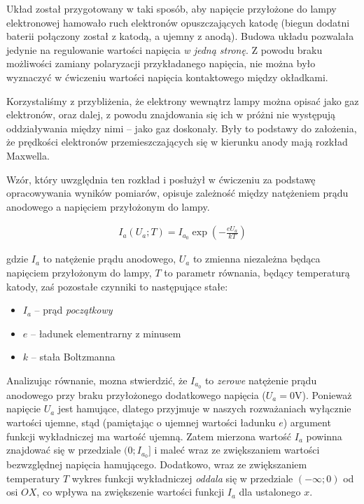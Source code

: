 \documentclass[a4paper]{article}
\newlength{\du}
\begin{document}
Układ został przygotowany w taki sposób, aby napięcie przyłożone do lampy elektronowej hamowało
ruch elektronów opuszczających katodę (biegun dodatni baterii połączony został z katodą, a ujemny z anodą).
Budowa układu pozwalała jedynie na regulowanie wartości napięcia \textit{w jedną stronę}.
Z powodu braku możliwości zamiany polaryzacji przykładanego napięcia, nie można było wyznaczyć 
w ćwiczeniu wartości napięcia kontaktowego między okładkami.

Korzystaliśmy z przybliżenia, że elektrony wewnątrz lampy można opisać jako gaz elektronów, oraz dalej, 
z powodu znajdowania się ich w próżni nie występują oddziaływania między nimi -- jako gaz doskonały.
Były to podstawy do założenia, że prędkości elektronów przemieszczających się w kierunku anody 
mają rozkład Maxwella.

Wzór, który uwzględnia ten rozkład i posłużył w ćwiczeniu za podstawę opracowywania wyników pomiarów,
opisuje zależność między natężeniem prądu anodowego a napięciem przyłożonym do lampy.

\begin{align}
	I_a(U_a; T) = I_{a_0} \exp{\left(-\frac{e U_a}{k T}\right)}
\label{eq1}
\end{align}

gdzie $I_a$ to natężenie prądu anodowego, $U_a$ to zmienna niezależna będąca napięciem przyłożonym do lampy,
$T$ to parametr równania, będący temperaturą katody, zaś pozostałe czynniki to następujące stałe:
\begin{itemize}
\item $I_a$ -- prąd \textit{początkowy}
\item $e$ -- ładunek elementrarny z minusem
\item $k$ -- stała Boltzmanna
\end{itemize}

Analizując równanie, mozna stwierdzić, że $I_{a_0}$ to \textit{zerowe} natężenie prądu anodowego przy
braku przyłożonego dodatkowego napięcia ($U_a = 0 \text{V}$). Ponieważ napięcie $U_a$ jest hamujące,
dlatego przyjmuje w naszych rozważaniach wyłącznie wartości ujemne, stąd (pamiętając o ujemnej wartości
ładunku $e$) argument funkcji wykładniczej ma wartość ujemną. Zatem mierzona wartość $I_a$ powinna 
znajdować się w przedziale $(0; I_{a_0}]$ i maleć wraz ze zwiększaniem wartości bezwzględnej
napięcia hamującego. Dodatkowo, wraz ze zwiększaniem temperatury $T$ wykres funkcji wykładniczej
\textit{oddala} się w przedziale $(-\infty; 0)$ od osi $OX$, co wpływa na zwiększenie wartości funkcji
$I_a$ dla ustalonego $x$.
\end{document}
